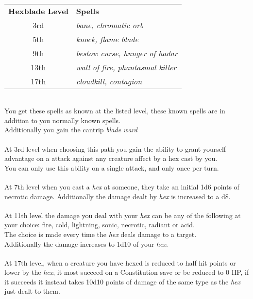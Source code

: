 \documentclass[a4paper]{article}
\begin{document}
\begin{multicols}{2}
\\
\begin{tabular}{cp{5cm}}
{\bf Hexblade Level} & {\bf Spells}                         \\
\rowcolor[HTML]{B8EFAD} 
3rd                 & \textit{bane, chromatic orb}\\
5th                 & \textit{knock, flame blade}\\
\rowcolor[HTML]{B8EFAD} 
9th                 & \textit{bestow curse, hunger of hadar}\\
13th                & \textit{wall of fire, phantasmal killer}\\
\rowcolor[HTML]{B8EFAD} 
17th                & \textit{cloudkill, contagion}\\
\end{tabular}
\\You get these spells as known at the listed level, these known spells are in addition to you normally known spells.\\
Additionally you gain the cantrip \textit{blade ward}\\
\\
At 3rd level when choosing this path you gain the ability to grant yourself advantage on a attack against any creature affect by a hex cast by you.\\
You can only use this ability on a single attack, and only once per turn.\\
\\
At 7th level when you cast a \textit{hex} at someone, they take an initial 1d6 points of necrotic damage. Additionally the damage dealt by \textit{hex} is increased to a d8.\\
\\
At 11th level the damage you deal with your \textit{hex} can be any of the following at your choice: fire, cold, lightning, sonic, necrotic, radiant or acid.\\
The choice is made every time the \textit{hex} deals damage to a target.\\
Additionally the damage increases to 1d10 of your \textit{hex}.\\
\\
At 17th level, when a creature you have hexed is reduced to half hit points or lower by the \textit{hex}, it most succeed on a Constitution save or be reduced to 0 HP, if it succeeds it instead takes 10d10 points of damage of the same type as the \textit{hex} just dealt to them.\\

\end{multicols}
\end{document}
